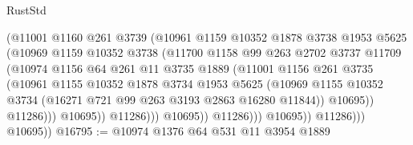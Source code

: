\begin{lexlean}{RustStd}
\begin{coremodule}
                                  (@11001
                                    @1160
                                    @261
                                    @3739
                                    (@10961
                                      @1159
                                      @10352
                                      @1878
                                      @3738
                                      @1953
                                      @5625
                                      (@10969
                                        @1159
                                        @10352
                                        @3738
                                        (@11700
                                          @1158
                                          @99
                                          @263
                                          @2702
                                          @3737
                                          @11709
                                          (@10974
                                            @1156
                                            @64
                                            @261
                                            @11
                                            @3735
                                            @1889
                                            (@11001
                                              @1156
                                              @261
                                              @3735
                                              (@10961
                                                @1155
                                                @10352
                                                @1878
                                                @3734
                                                @1953
                                                @5625
                                                (@10969
                                                  @1155
                                                  @10352
                                                  @3734
                                                  (@16271 @721 @99 @263 @3193 @2863 @16280 @11844))
                                                @10695))
                                            @11286)))
                                      @10695))
                                  @11286)))
                            @10695))
                        @11286)))
                  @10695))
              @11286)))
        @10695))
@16795 := @10974 @1376 @64 @531 @11 @3954 @1889

\end{coremodule}
\end{lexlean}

